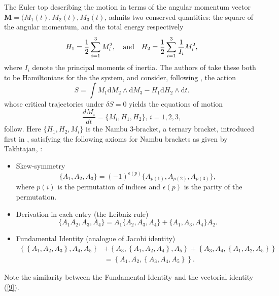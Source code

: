 \documentclass[fleqn,11pt,twoside]{article}
\theoremstyle{definition}
\begin{document}
The Euler top describing the motion in terms of the angular momentum vector 
$\boldsymbol{M}=(M_1(t),M_2(t),M_3(t)$, admits two conserved quantities: the square of the angular momentum, and the 
total energy respectively 
\begin{equation}
H_1=\frac{1}{2}\sum_{i=1}^{3}M_i^2, \quad {\rm and}\quad H_2=\frac{1}{2}\sum_{i=1}^{3}\frac{1}{I_i}M_i^2,
\end{equation} 
where $I_i$ denote the principal moments of inertia. 
The authors of \cite{Minic} take these both to be Hamiltonians for the the system, and consider, following \cite{takhtajan}, the action 
\begin{equation}\label{eq:action} 
S=\int M_1 \mathrm{d}M_2\wedge \mathrm{d}M_3 -H_1\mathrm{d}H_2\wedge \mathrm{d}t.
\end{equation}
whose critical trajectories under $\delta S=0$ yields 
the equations of motion 
\begin{equation}\label{eq:Nambu-eqs} 
\frac{dM_i}{dt}=\{M_i,H_1,H_2\},\,i=1,2,3,
\end{equation}
follow. Here $\{H_1,H_2,M_i\}$ is the Nambu 3-bracket, a ternary bracket, introduced first in \cite{Nambu}, satisfying the following axioms for Nambu brackets as given by Takhtajan, \cite{takhtajan}:
\begin{itemize}
\item
Skew-symmetry
\begin{equation}
\{A_1,A_2,A_3\}=(-1)^{\epsilon(p)}\{A_{p(1)},A_{p(2)},A_{p(3)}\},
\end{equation}
where $p(i)$ is the permutation of indices and $\epsilon(p)$ is the parity of the permutation.
\item
Derivation in each entry (the Leibniz rule)
\begin{equation}
\{A_1A_2,A_3,A_4\}=A_1\{A_2,A_3,A_4\}+\{A_1,A_3,A_4\}A_2.
\end{equation}
\item
Fundamental Identity (analogue of Jacobi identity)
\begin{equation}
\begin{split}
\left\{\left\{A_1,A_2,A_3\right\},A_4,A_5\right\}&+\left\{A_3,\left\{A_1,A_2,A_4\right\},A_5\right\}+\left\{A_3,A_4,\left\{A_1,A_2,A_5\right\}\right\}\\
&=\left\{A_1,A_2,\left\{A_3,A_4,A_5\right\}\right\}.
\end{split}
\end{equation}
\end{itemize}
Note the similarity between the Fundamental Identity and the vectorial identity (\ref{9}).
\end{document}
